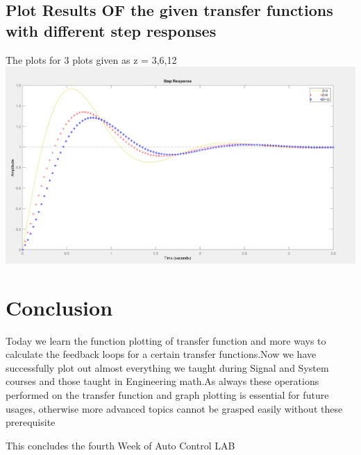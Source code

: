 \documentclass[12pt]{article}
\begin{document}
\subsection{Plot Results OF the given  transfer functions with different step responses} 
The plots for 3 plots given as z = 3,6,12\\ 
\includegraphics[scale=0.5]{../Lab6/HW0_result.png} \\



\section{Conclusion}
Today we learn the function plotting of transfer function and more ways to calculate the feedback loops for a certain transfer functions.Now we have successfully plot out almost everything we taught during Signal and System courses and those taught in Engineering math.As always these operations performed on the transfer function and graph plotting is essential for future usages, otherwise more advanced topics cannot be grasped easily without these prerequisite~

\begin{center} 
This concludes the fourth Week of Auto Control LAB\\
\end{center}
\end{document}
